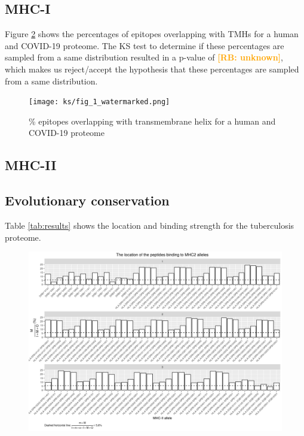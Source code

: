 \documentclass{article}
\newcommand{\richel}[1]{\textcolor{orange}{\textbf{[RB: #1]}}}
\begin{document}
\subsection{MHC-I}

Figure \ref{fig:1} shows the percentages of epitopes overlapping 
with TMHs for a human and COVID-19 proteome.
The KS test to determine if these percentages are sampled from
a same distribution resulted in a p-value of \richel{unknown},
which makes us reject/accept the hypothesis that these percentages
are sampled from a same distribution. 

\begin{figure}[!htbp]
  \texttt{[image: ks/fig\_1\_watermarked.png]}
  \caption{
    \% epitopes overlapping with transmembrane helix
    for a human and COVID-19 proteome
  }
  \label{fig:1}
\end{figure}



\subsection{MHC-II}

\subsection{Evolutionary conservation}

\iffalse
	Table \ref{tab:results} shows the location and binding strength for the
	tuberculosis proteome.

	\begin{figure}[ht]
	  \includegraphics[width=\textwidth]{figure_1.png}
	  \label{fig:1}
	\end{figure}
\end{document}
